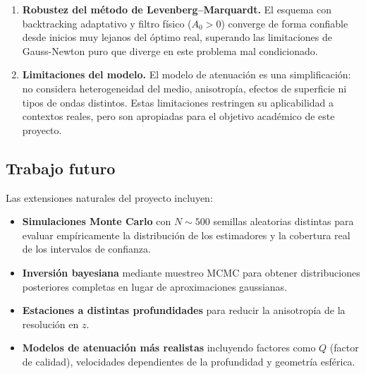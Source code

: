 \documentclass[12pt, a4paper]{article}
\begin{document}
\begin{enumerate}
    \item \textbf{Robustez del método de Levenberg--Marquardt.} El
    esquema con backtracking adaptativo y filtro físico ($A_0 > 0$)
    converge de forma confiable desde inicios muy lejanos del óptimo
    real, superando las limitaciones de Gauss-Newton puro que diverge
    en este problema mal condicionado.

    \item \textbf{Limitaciones del modelo.} El modelo de atenuación
    es una simplificación: no considera heterogeneidad del medio,
    anisotropía, efectos de superficie ni tipos de ondas distintos.
    Estas limitaciones restringen su aplicabilidad a contextos reales,
    pero son apropiadas para el objetivo académico de este proyecto.

\end{enumerate}

\subsection*{Trabajo futuro}
\label{sec:trabajo_futuro}

Las extensiones naturales del proyecto incluyen:

\begin{itemize}[leftmargin=*, itemsep=2pt]
    \item \textbf{Simulaciones Monte Carlo} con $N \sim 500$ semillas
    aleatorias distintas para evaluar empíricamente la distribución
    de los estimadores y la cobertura real de los intervalos de
    confianza.
    \item \textbf{Inversión bayesiana} mediante muestreo MCMC para
    obtener distribuciones posteriores completas en lugar de
    aproximaciones gaussianas.
    \item \textbf{Estaciones a distintas profundidades} para reducir
    la anisotropía de la resolución en $z$.
    \item \textbf{Modelos de atenuación más realistas} incluyendo
    factores como $Q$ (factor de calidad), velocidades dependientes
    de la profundidad y geometría esférica.
\end{itemize}

\newpage



\appendix
\end{document}
